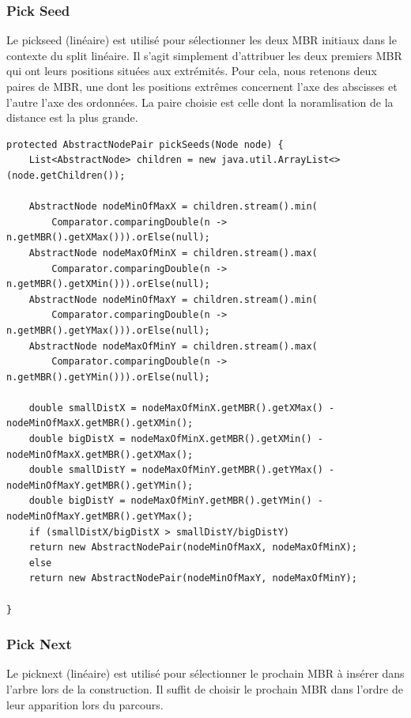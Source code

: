 \documentclass {article}
\begin{document}
\subsubsection {Pick Seed}

Le pickseed (linéaire) est utilisé pour sélectionner les deux MBR initiaux dans le contexte du split linéaire. 
Il s'agit simplement d'attribuer les deux premiers MBR qui ont leurs positions situées aux extrémités. 
Pour cela, nous retenons deux paires de MBR, une dont les positions extrêmes concernent l'axe des abscisses et 
l'autre l'axe des ordonnées.
La paire choisie est celle dont la noramlisation de la distance est la plus grande.



\begin{verbatim}
protected AbstractNodePair pickSeeds(Node node) {
    List<AbstractNode> children = new java.util.ArrayList<>(node.getChildren());

    AbstractNode nodeMinOfMaxX = children.stream().min(
	    Comparator.comparingDouble(n -> n.getMBR().getXMax())).orElse(null);
    AbstractNode nodeMaxOfMinX = children.stream().max(
	    Comparator.comparingDouble(n -> n.getMBR().getXMin())).orElse(null);
    AbstractNode nodeMinOfMaxY = children.stream().min(
	    Comparator.comparingDouble(n -> n.getMBR().getYMax())).orElse(null);
    AbstractNode nodeMaxOfMinY = children.stream().max(
	    Comparator.comparingDouble(n -> n.getMBR().getYMin())).orElse(null);

    double smallDistX = nodeMaxOfMinX.getMBR().getXMax() - nodeMinOfMaxX.getMBR().getXMin();
    double bigDistX = nodeMaxOfMinX.getMBR().getXMin() - nodeMinOfMaxX.getMBR().getXMax();
    double smallDistY = nodeMaxOfMinY.getMBR().getYMax() - nodeMinOfMaxY.getMBR().getYMin();
    double bigDistY = nodeMaxOfMinY.getMBR().getYMin() - nodeMinOfMaxY.getMBR().getYMax();
    if (smallDistX/bigDistX > smallDistY/bigDistY) 
	return new AbstractNodePair(nodeMinOfMaxX, nodeMaxOfMinX);
    else
	return new AbstractNodePair(nodeMinOfMaxY, nodeMaxOfMinY);

}
\end{verbatim}

\subsubsection {Pick Next}

Le picknext (linéaire) est utilisé pour sélectionner le prochain MBR à insérer dans l'arbre lors de la construction. 
Il suffit de choisir le prochain MBR dans l'ordre de leur apparition lors du parcours.
\end{document}
